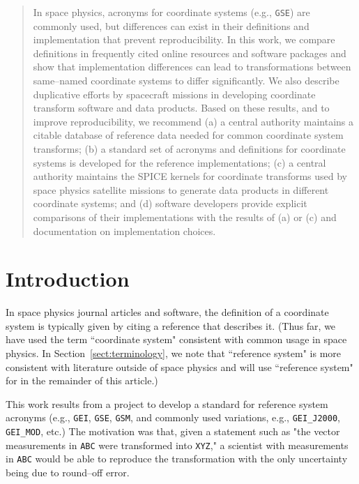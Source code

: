 \documentclass[draft]{agujournal2019}
\begin{document}
\begin{abstract}
In space physics, acronyms for coordinate systems (e.g., \texttt{GSE}) are commonly used, but differences can exist in their definitions and implementation that prevent reproducibility. In this work, we compare definitions in frequently cited online resources and software packages and show that implementation differences can lead to transformations between same--named coordinate systems to differ significantly. We also describe duplicative efforts by spacecraft missions in developing coordinate transform software and data products. Based on these results, and to improve reproducibility, we recommend (a) a central authority maintains a citable database of reference data needed for common coordinate system transforms; (b) a standard set of acronyms and definitions for coordinate systems is developed for the reference implementations; (c) a central authority maintains the SPICE kernels for coordinate transforms used by space physics satellite missions to generate data products in different coordinate systems; and (d) software developers provide explicit comparisons of their implementations with the results of (a) or (c) and documentation on implementation choices.
\end{abstract}

\section{Introduction}

In space physics journal articles and software, the definition of a coordinate system is typically given by citing a reference that describes it. (Thus far, we have used the term ``coordinate system" consistent with common usage in space physics. In Section~\ref{sect:terminology}, we note that ``reference system" is more consistent with literature outside of space physics and will use ``reference system" for in the remainder of this article.)

This work results from a project to develop a standard for reference system acronyms (e.g., \texttt{GEI}, \texttt{GSE}, \texttt{GSM}, and commonly used variations, e.g., \texttt{GEI\_J2000}, \texttt{GEI\_MOD}, etc.) The motivation was that, given a statement such as "the vector measurements in \texttt{ABC} were transformed into \texttt{XYZ}," a scientist with measurements in \texttt{ABC} would be able to reproduce the transformation with the only uncertainty being due to round--off error.
\end{document}
